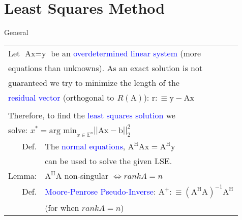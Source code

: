 \section{Least Squares Method}
\begin{mainbox}{General}
\setlength{\tabcolsep}{2pt}
\begin{tabular}{rl}
	\multicolumn{2}{l}{Let $\text{Ax} = \text{y}$ be an \textcolor{blue}{overdetermined linear system} (more}\\
	\multicolumn{2}{l}{equations than unknowns). As an exact solution is not}\\
	\multicolumn{2}{l}{guaranteed we try to minimize the length of the}\\
	\multicolumn{2}{l}{\textcolor{blue}{residual vector} (orthogonal to $^{}R(\text{A})$): $\text{r} :\equiv \text{y} - \text{Ax}$}\\
	\\
	\multicolumn{2}{l}{Therefore, to find the \textcolor{blue}{least squares solution} we}\\
	\multicolumn{2}{l}{solve: $x^* = \text{arg min}_{x\in\mathbb{E}^n}||\text{Ax}-\text{b}||_2^2$}\\
	\rule{0pt}{3ex}
	Def. & The \textcolor{blue}{normal equations}, $\text{A}^\text{H}\text{Ax} = \text{A}^\text{H}\text{y}$\\
	& can be used to solve the given LSE.\\
	Lemma: & $\text{A}^\text{H}\text{A}$ non-singular $\Leftrightarrow rankA = n$\\
	\rule{0pt}{3ex}
	Def. & \textcolor{blue}{Moore-Penrose Pseudo-Inverse}: $\text{A}^+ :\equiv (\text{A}^\text{H}\text{A})^{-1}\text{A}^\text{H}$\\
	& (for when $rankA = n$)\\
\end{tabular}
\end{mainbox}